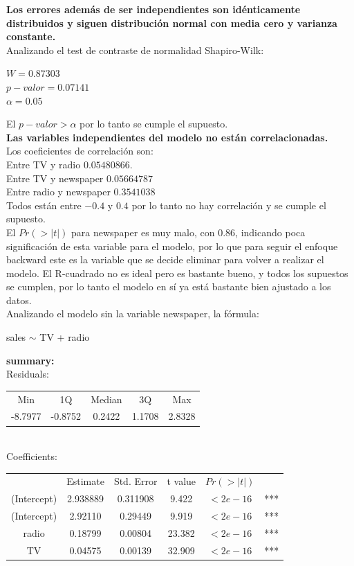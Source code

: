 \documentclass[12pt,a4paper]{article}
\begin{document}
	\textbf{Los errores además de ser independientes son idénticamente distribuidos y siguen distribución normal con media cero y varianza constante.}\\
	Analizando el test de contraste de normalidad Shapiro-Wilk:
	\begin{center}
		$W = 0.87303$ \\
		$p-valor = 0.07141$\\
		$\alpha = 0.05$
	\end{center}
	El $p-valor > \alpha$ por lo tanto se cumple el supuesto.\\
	
	\textbf{Las variables independientes del modelo no están correlacionadas.}\\
	Los coeficientes de correlación son:\\
	Entre TV y radio $0.05480866$.\\
	Entre TV y newspaper $0.05664787$\\
	Entre radio y newspaper $0.3541038$\\
	Todos están entre $-0.4$ y $0.4$ por lo tanto no hay correlación y se cumple el supuesto.\\
	
	El $Pr(>|t|)$ para newspaper es muy malo, con 0.86, indicando poca significación de esta variable para el modelo, por lo que para seguir el enfoque backward este es la variable que se decide eliminar para volver a realizar el modelo. El R-cuadrado no es ideal pero es bastante bueno, y todos los supuestos se cumplen, por lo tanto el modelo en sí ya está bastante bien ajustado a los datos.\\
	
	Analizando el modelo sin la variable newspaper, la fórmula:
	\begin{center}
		sales $\sim$ TV + radio 
	\end{center}
	
	{\bf summary: }\\
	
	Residuals:\\
	
	\begin{tabular}{ccccc}
		Min&     1Q& Median& 3Q&    Max\\
		-8.7977& -0.8752&  0.2422&  1.1708&  2.8328 
	\end{tabular}\\ 
	
	Coefficients:\\
	
	\begin{tabular}{cccccc}
		&     Estimate & Std. Error&     t value&   $Pr(>|t|)$&\\
		(Intercept) & 2.938889 &  0.311908 &  9.422  & $<2e-16$ &***\\
		(Intercept) & 2.92110  &  0.29449  & 9.919   & $<2e-16$ &***\\
		radio       & 0.18799  &  0.00804  & 23.382  & $<2e-16$ &***\\
		TV          & 0.04575  &  0.00139  & 32.909  & $<2e-16$ &***\\
	\end{tabular}\\
	
\end{document}
